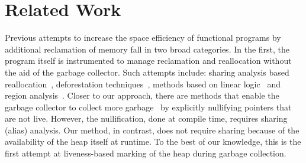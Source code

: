 \documentclass[9pt]{sigplanconf}
\newcommand{\cred}[1]{{\color{red}{#1}}}
\begin{document}




\section{Related Work} 
\cred{Need to rewrite this entire section need to probably mention some of these 
papers at least i found by googling liveness based GC,\\
http://www.cs.hmc.edu/~oneill/papers/Simplifiers-MSPC.pdf\\
http://costa.ls.fi.upm.es/papers/costa/AlbertGGZ12.pdf\\
http://hirzels.com/martin/papers/ecoop01-gc-liveness.pdf\\
}
Previous attempts to  increase  the space
efficiency
of functional programs by additional  reclamation of memory fall in two
broad categories. In the first,  the program itself is instrumented to
manage  reclamation and reallocation  without the  aid of  the garbage
collector.    Such    attempts   include:   sharing    analysis   based
reallocation~\cite{jones89compile},                       deforestation
techniques~\cite{wadler88deforest,gill93ashort,chitil99deforest},
methods  based  on   linear  logic~\cite{hofmann00linear}  and  region
analysis~\cite{tofte98region}.   Closer  to  our approach,  there  are
methods   that  enable   the   garbage  collector   to  collect   more
garbage~\cite{inoue88analysis,lee05static}   by
explicitly  nullifying  pointers  that  are not  live.   However,  the
nullification,  done   at  compile  time,   requires  sharing  (alias)
analysis.  Our  method, in contrast, does not  require sharing because
of the availability of the heap  itself at runtime.  To the best of our
knowledge, this is the first  attempt at liveness-based marking of the
heap during garbage collection.
\end{document}
